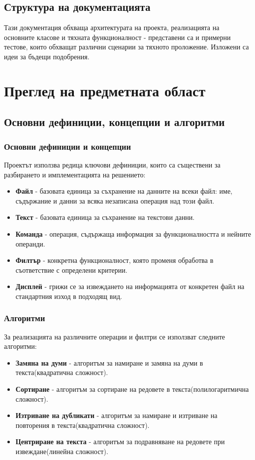\documentclass[a4paper,12pt]{article}
\begin{document}
\subsection{Структура на документацията}
Тази документация обхваща архитектурата на проекта, реализацията на основните класове и тяхната функционалност - представени са и примерни тестове, които обхващат различни сценарии за тяхното проложение.
Изложени са идеи за бъдещи подобрения.

\section{Преглед на предметната област}
\subsection{Основни дефиниции, концепции и алгоритми}
\subsubsection{Основни дефиниции и концепции}
Проектът използва редица ключови дефиниции, които са съществени за разбирането и имплементацията на решението:
\begin{itemize}
    \item \textbf{Файл} - базовата единица за съхранение на данните на всеки файл: име, съдържание и данни за всяка незаписана операция над този файл.
    \item \textbf{Текст} - базовата единица за съхранение на текстови данни.
    \item \textbf{Команда} - операция, съдържаща информация за функционалността и нейните операнди.
    \item \textbf{Филтър} - конкретна функционалност, която променя обработва в съответствие с определени критерии.
    \item \textbf{Дисплей} - грижи се за извеждането на информацията от конкретен файл на стандартния изход в подходящ вид.
\end{itemize}

\subsubsection{Алгоритми}
За реализацията на различните операции и филтри се използват следните алгоритми:
\begin{itemize}
    \item \textbf{Замяна на думи} - алгоритъм за намиране и замяна на думи в текста(квадратична сложност).
    \item \textbf{Сортиране} - алгоритъм за сортиране на редовете в текста(полилогаритмична сложност).
    \item \textbf{Изтриване на дубликати} - алгоритъм за намиране и изтриване на повторения в текста(квадратична сложност).
    \item \textbf{Центриране на текста} - алгоритъм за подравняване на редовете при извеждане(линейна сложност).
\end{itemize}
\end{document}
